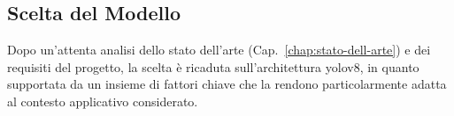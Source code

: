 \documentclass[12pt,a4paper,openright,twoside]{book}
\begin{document}
\subsection{Scelta del Modello}
\label{sec:scelta-modello}

Dopo un'attenta analisi dello stato dell'arte
(Cap.~\ref{chap:stato-dell-arte}) e dei requisiti del progetto,
la scelta è ricaduta sull'architettura \ac{yolo}v8, in quanto
supportata da un insieme di fattori chiave che la rendono
particolarmente adatta al contesto applicativo considerato.


\end{document}
